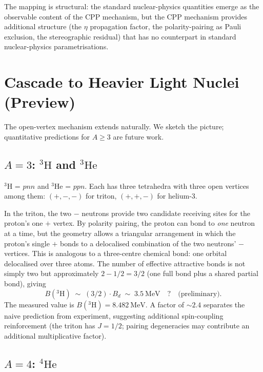 \documentclass[11pt,letterpaper]{article}
\newcommand{\Bd}{B_{d}}
\begin{document}
The mapping is structural: the standard nuclear-physics quantities emerge as the observable content of the CPP mechanism, but the CPP mechanism provides additional structure (the $\eta$ propagation factor, the polarity-pairing as Pauli exclusion, the stereographic residual) that has no counterpart in standard nuclear-physics parametrisations.

\section{Cascade to Heavier Light Nuclei (Preview)}
\label{sec:cascade}

The open-vertex mechanism extends naturally. We sketch the picture; quantitative predictions for $A \geq 3$ are future work.

\subsection{$A = 3$: ${}^{3}\mathrm{H}$ and ${}^{3}\mathrm{He}$}

${}^{3}\mathrm{H}$ = $pnn$ and ${}^{3}\mathrm{He}$ = $ppn$. Each has three tetrahedra with three open vertices among them: $(+, -, -)$ for triton, $(+, +, -)$ for helium-3.

In the triton, the two $-$ neutrons provide two candidate receiving sites for the proton's one $+$ vertex. By polarity pairing, the proton can bond to \emph{one} neutron at a time, but the geometry allows a triangular arrangement in which the proton's single $+$ bonds to a delocalised combination of the two neutrons' $-$ vertices. This is analogous to a three-centre chemical bond: one orbital delocalised over three atoms. The number of effective attractive bonds is not simply two but approximately $2 - 1/2 = 3/2$ (one full bond plus a shared partial bond), giving
\begin{equation*}
B({}^{3}\mathrm{H}) \;\sim\; (3/2) \cdot \Bd \;\sim\; 3.5~\mathrm{MeV} \quad ? \quad\mbox{(preliminary)}.
\end{equation*}
The measured value is $B({}^{3}\mathrm{H}) = 8.482~\mathrm{MeV}$. A factor of $\sim 2.4$ separates the naive prediction from experiment, suggesting additional spin-coupling reinforcement (the triton has $J = 1/2$; pairing degeneracies may contribute an additional multiplicative factor).

\subsection{$A = 4$: ${}^{4}\mathrm{He}$}
\end{document}

